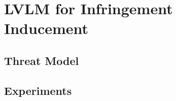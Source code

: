 \section{LVLM for Infringement Inducement}
\label{Inducement}
\subsection{Threat Model}

\subsection{Experiments}